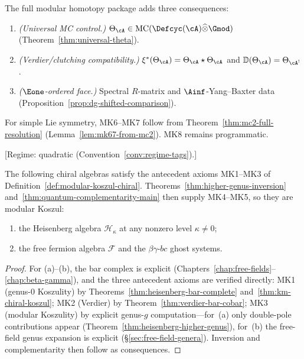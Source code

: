 \begin{remark}
\label{rem:extended-axiom-schema}
The full modular homotopy package adds three consequences:
\begin{enumerate}[label=\textup{(MK\arabic*)},start=6]
\item\label{MK:mc-control}
\emph{(Universal MC control.)}
$\Theta_{\cA}\in\operatorname{MC}(\Defcyc(\cA)\widehat{\otimes}\Gmod)$
(Theorem~\ref{thm:universal-theta}).
\item\label{MK:clutching-verdier}
\emph{(Verdier/clutching compatibility.)}
$\xi^*(\Theta_{\cA})=\Theta_{\cA}\star\Theta_{\cA}$ and
$\mathbb{D}(\Theta_{\cA})=\Theta_{\cA^!}$.
\item\label{MK:e1-face}
\emph{($\Eone$-ordered face.)} Spectral $R$-matrix and
$\Ainf$-Yang--Baxter data
(Proposition~\ref{prop:dg-shifted-comparison}).
\end{enumerate}
For simple Lie symmetry, MK6--MK7 follow from
Theorem~\ref{thm:mc2-full-resolution}
(Lemma~\ref{lem:mk67-from-mc2}).  MK8 remains programmatic.
\end{remark}

\begin{proposition}
\label{prop:standard-examples-modular-koszul}
\textup{[Regime: quadratic
\textup{(}Convention~\textup{\ref{conv:regime-tags})}.]}

The following chiral algebras satisfy the antecedent axioms
\textup{MK1--MK3} of Definition~\textup{\ref{def:modular-koszul-chiral}}.
Theorems~\textup{\ref{thm:higher-genus-inversion}}
and~\textup{\ref{thm:quantum-complementarity-main}} then supply
\textup{MK4--MK5}, so they are modular Koszul:
\begin{enumerate}[label=\textup{(\alph*)}]
\item the Heisenberg algebra $\mathcal{H}_\kappa$ at any nonzero level
  $\kappa \neq 0$\textup{;}
\item the free fermion algebra $\mathcal{F}$ and the $\beta\gamma$-$bc$
  ghost systems.
\end{enumerate}
\end{proposition}

\begin{proof}
For (a)--(b), the bar complex is explicit
(Chapters~\ref{chap:free-fields}--\ref{chap:beta-gamma}), and the
three antecedent axioms are verified directly:
MK1 (genus-0 Koszulity) by
Theorems~\ref{thm:heisenberg-bar-complete} and~\ref{thm:km-chiral-koszul};
MK2 (Verdier) by Theorem~\ref{thm:verdier-bar-cobar};
MK3 (modular Koszulity) by explicit genus-$g$ computation---for~(a)
only double-pole contributions appear (Theorem~\ref{thm:heisenberg-higher-genus}),
for~(b) the free-field genus expansion is explicit
(\S\ref{sec:free-field-genera}).
Inversion and complementarity then follow as consequences.
\end{proof}

